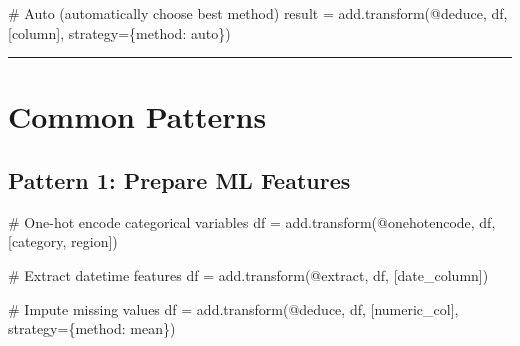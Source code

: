 \documentclass[
  letterpaper,
]{scrbook}
\newenvironment{Shaded}{\begin{snugshade}}{\end{snugshade}}
\newcommand{\CommentTok}[1]{\textcolor[rgb]{0.37,0.37,0.37}{#1}}
\newcommand{\NormalTok}[1]{\textcolor[rgb]{0.00,0.23,0.31}{#1}}
\newcommand{\OperatorTok}[1]{\textcolor[rgb]{0.37,0.37,0.37}{#1}}
\newcommand{\StringTok}[1]{\textcolor[rgb]{0.13,0.47,0.30}{#1}}
\begin{document}
\begin{Shaded}
\begin{Highlighting}[]
\CommentTok{\# Auto (automatically choose best method)}
\NormalTok{result }\OperatorTok{=}\NormalTok{ add.transform(}\StringTok{\textquotesingle{}@deduce\textquotesingle{}}\NormalTok{, df, [}\StringTok{\textquotesingle{}column\textquotesingle{}}\NormalTok{], strategy}\OperatorTok{=}\NormalTok{\{}\StringTok{\textquotesingle{}method\textquotesingle{}}\NormalTok{: }\StringTok{\textquotesingle{}auto\textquotesingle{}}\NormalTok{\})}
\end{Highlighting}
\end{Shaded}

\begin{center}\rule{0.5\linewidth}{0.5pt}\end{center}

\section{Common Patterns}\label{common-patterns-4}

\subsection{Pattern 1: Prepare ML
Features}\label{pattern-1-prepare-ml-features}

\begin{Shaded}
\begin{Highlighting}[]
\CommentTok{\# One{-}hot encode categorical variables}
\NormalTok{df }\OperatorTok{=}\NormalTok{ add.transform(}\StringTok{\textquotesingle{}@onehotencode\textquotesingle{}}\NormalTok{, df, [}\StringTok{\textquotesingle{}category\textquotesingle{}}\NormalTok{, }\StringTok{\textquotesingle{}region\textquotesingle{}}\NormalTok{])}

\CommentTok{\# Extract datetime features}
\NormalTok{df }\OperatorTok{=}\NormalTok{ add.transform(}\StringTok{\textquotesingle{}@extract\textquotesingle{}}\NormalTok{, df, [}\StringTok{\textquotesingle{}date\_column\textquotesingle{}}\NormalTok{])}

\CommentTok{\# Impute missing values}
\NormalTok{df }\OperatorTok{=}\NormalTok{ add.transform(}\StringTok{\textquotesingle{}@deduce\textquotesingle{}}\NormalTok{, df, [}\StringTok{\textquotesingle{}numeric\_col\textquotesingle{}}\NormalTok{], strategy}\OperatorTok{=}\NormalTok{\{}\StringTok{\textquotesingle{}method\textquotesingle{}}\NormalTok{: }\StringTok{\textquotesingle{}mean\textquotesingle{}}\NormalTok{\})}
\end{Highlighting}
\end{Shaded}
\end{document}
